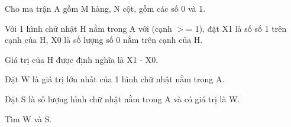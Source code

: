 Cho ma trận A gồm M hàng, N cột, gồm các số 0 và 1.

Với 1 hình chữ nhật H nằm trong A với (cạnh $>$= 1), đặt X1 là số số 1 trên cạnh của H, X0 là số lượng số 0 nằm trên cạnh của H.

Giá trị của H được định nghĩa là X1 - X0.

Đặt W là giá trị lớn nhất của 1 hình chữ nhật nằm trong A.

Đặt S là số lượng hình chữ nhật nằm trong A và có giá trị là W.

Tìm W và S.